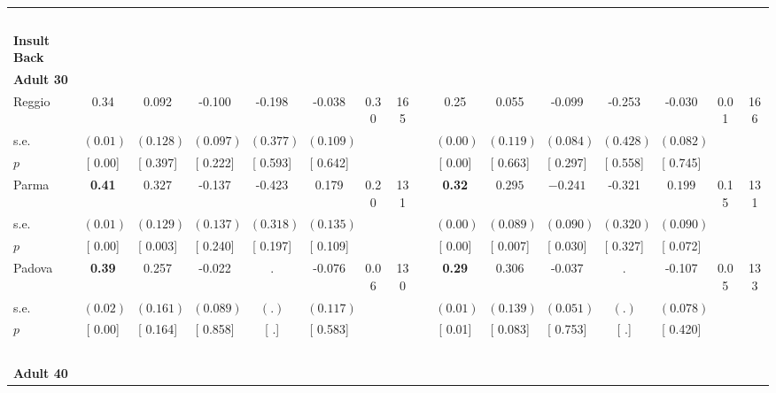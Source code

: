 \begin{longtable}{L{8em} c c c c c c c p{1em} c c c c c c c}
~\\[1em]
\textbf{Insult Back} \\*
\quad \quad \textbf{Adult 30} & & & & & & & & & & & & & & & \\* 
\quad \quad \quad Reggio& 0.34 &     0.092 &    -0.100 &    -0.198 &    -0.038 &      0.30 &       165 & & 0.25 &     0.055 &    -0.099 &    -0.253 &    -0.030 &      0.01 &       166  \\*
\quad \quad \quad \quad s.e.& $ (     0.01)$ & $ (    0.128)$ & $ (    0.097)$ & $ (    0.377)$ & $ (    0.109)$ & & & & $ (     0.00)$ & $ (    0.119)$ & $ (    0.084)$ & $ (    0.428)$ & $ (    0.082)$ & &  \\*
\quad \quad \quad \quad $ p$ & [     0.00] & [    0.397] & [    0.222] & [    0.593] & [    0.642] & & & & [     0.00] & [    0.663] & [    0.297] & [    0.558] & [    0.745] & &  \\[1em]
\quad \quad \quad Parma& \textbf{     0.41} & $ \mathbf{    0.327}$ &    -0.137 &    -0.423 &     0.179 &      0.20 &       131 & & \textbf{     0.32} & $ \mathbf{    0.295}$ & $ \mathbf{   -0.241}$ &    -0.321 & $ \mathbf{    0.199}$ &      0.15 &       131  \\*
\quad \quad \quad \quad s.e.& $ (     0.01)$ & $ (    0.129)$ & $ (    0.137)$ & $ (    0.318)$ & $ (    0.135)$ & & & & $ (     0.00)$ & $ (    0.089)$ & $ (    0.090)$ & $ (    0.320)$ & $ (    0.090)$ & &  \\*
\quad \quad \quad \quad $ p$ & [     0.00] & [    0.003] & [    0.240] & [    0.197] & [    0.109] & & & & [     0.00] & [    0.007] & [    0.030] & [    0.327] & [    0.072] & &  \\[1em]
\quad \quad \quad Padova& \textbf{     0.39} &     0.257 &    -0.022 &         . &    -0.076 &      0.06 &       130 & & \textbf{     0.29} & $ \mathbf{    0.306}$ &    -0.037 &         . &    -0.107 &      0.05 &       133  \\*
\quad \quad \quad \quad s.e.& $ (     0.02)$ & $ (    0.161)$ & $ (    0.089)$ & $ (        .)$ & $ (    0.117)$ & & & & $ (     0.01)$ & $ (    0.139)$ & $ (    0.051)$ & $ (        .)$ & $ (    0.078)$ & &  \\*
\quad \quad \quad \quad $ p$ & [     0.00] & [    0.164] & [    0.858] & [        .] & [    0.583] & & & & [     0.01] & [    0.083] & [    0.753] & [        .] & [    0.420] & &  \\[1em]
~\\[1em]
\quad \quad \textbf{Adult 40} & & & & & & & & & & & & & & & \\* 

\end{longtable}
